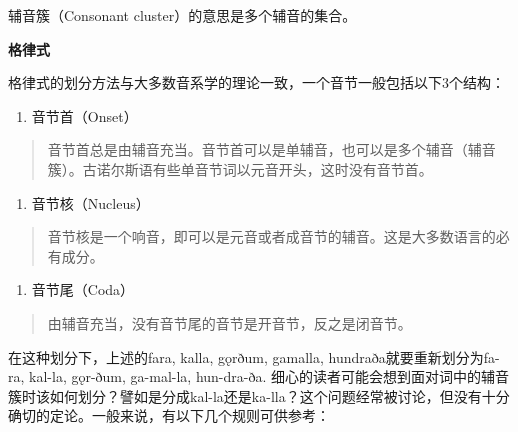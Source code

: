 辅音簇（Consonant cluster）的意思是多个辅音的集合。

\textbf{格律式}

格律式的划分方法与大多数音系学的理论一致，一个音节一般包括以下3个结构：

\begin{enumerate}
  \def\labelenumi{\arabic{enumi}.}
  \item
        音节首（Onset）
\end{enumerate}

\begin{quote}
  音节首总是由辅音充当。音节首可以是单辅音，也可以是多个辅音（辅音簇）。古诺尔斯语有些单音节词以元音开头，这时没有音节首。
\end{quote}

\begin{enumerate}
  \def\labelenumi{\arabic{enumi}.}
  \setcounter{enumi}{1}
  \item
        音节核（Nucleus）
\end{enumerate}

\begin{quote}
  音节核是一个响音，即可以是元音或者成音节的辅音。这是大多数语言的必有成分。
\end{quote}

\begin{enumerate}
  \def\labelenumi{\arabic{enumi}.}
  \setcounter{enumi}{2}
  \item
        音节尾（Coda）
\end{enumerate}

\begin{quote}
  由辅音充当，没有音节尾的音节是开音节，反之是闭音节。
\end{quote}

在这种划分下，上述的fara, kalla, gǫrðum, gamalla,
hundraða就要重新划分为fa-ra, kal-la, gǫr-ðum, ga-mal-la, hun-dra-ða.
细心的读者可能会想到面对词中的辅音簇时该如何划分？譬如是分成kal-la还是ka-lla？这个问题经常被讨论，但没有十分确切的定论。一般来说，有以下几个规则可供参考：

